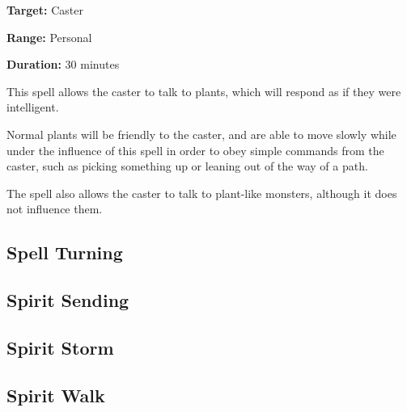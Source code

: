 \begin{multicols*}{2}
{\textbf{Target:} Caster

\textbf{Range:} Personal

\textbf{Duration:} 30 minutes}

This spell allows the caster to talk to plants, which will respond as if they were intelligent.

Normal plants will be friendly to the caster, and are able to move slowly while under the influence of this spell in order to obey simple commands from the caster, such as picking something up or leaning out of the way of a path.

The spell also allows the caster to talk to plant-like monsters, although it does not influence them.

\subsection{Spell Turning}\label{spell:Spell Turning}


\subsection{Spirit Sending}\label{spell:Spirit Sending}


\subsection{Spirit Storm}\label{spell:Spirit Storm}


\subsection{Spirit Walk}\label{spell:Spirit Walk}
\end{multicols*}

